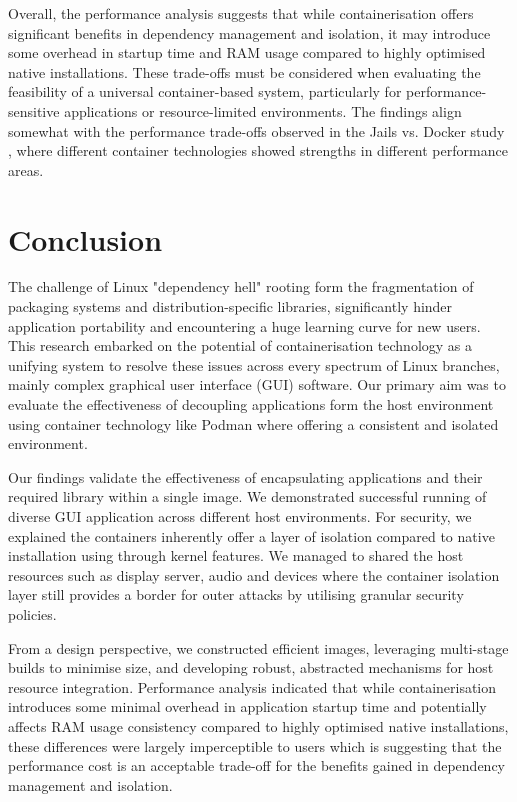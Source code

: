 \documentclass[journal,onecolumn]{IEEEtran}
\begin{document}
Overall, the performance analysis suggests that while containerisation offers significant benefits in dependency management and isolation, it may introduce some overhead in startup time and RAM usage compared to highly optimised native installations. These trade-offs must be considered when evaluating the feasibility of a universal container-based system, particularly for performance-sensitive applications or resource-limited environments. The findings align somewhat with the performance trade-offs observed in the Jails vs. Docker study \cite{Ryding_Johansson_2020}, where different container technologies showed strengths in different performance areas.

\newpage
\section{Conclusion}
The challenge of Linux "dependency hell" rooting form the fragmentation of packaging systems and distribution-specific libraries, significantly hinder application portability and encountering a huge learning curve for new users. This research embarked on the potential of containerisation technology as a unifying system to resolve these issues across every spectrum of Linux branches, mainly complex graphical user interface (GUI) software. Our primary aim was to evaluate the effectiveness of decoupling applications form the host environment using container technology like Podman where offering a consistent and isolated environment.

Our findings validate the effectiveness of encapsulating applications and their required library within a single image. We demonstrated successful running of diverse GUI application across different host environments. For security, we explained the containers inherently offer a layer of isolation compared to native installation using through kernel features. We managed to shared the host resources such as display server, audio and devices where the container isolation layer still provides a border for outer attacks by utilising granular security policies.

From a design perspective, we constructed efficient images, leveraging multi-stage builds to minimise size, and developing robust, abstracted mechanisms for host resource integration. Performance analysis indicated that while containerisation introduces some minimal overhead in application startup time and potentially affects RAM usage consistency compared to highly optimised native installations, these differences were largely imperceptible to users which is suggesting that the performance cost is an acceptable trade-off for the benefits gained in dependency management and isolation.
\end{document}
